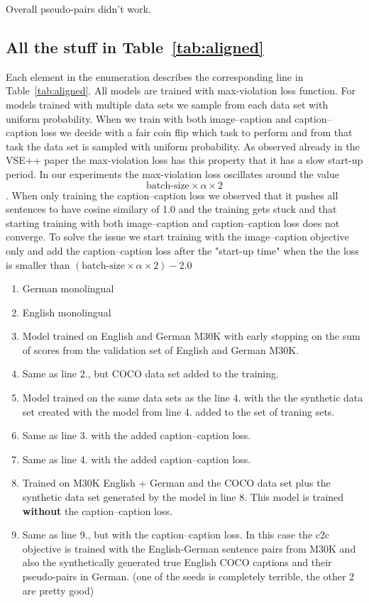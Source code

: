 Overall pseudo-pairs didn't work.

\subsection{All the stuff in Table~\ref{tab:aligned}}

Each element in the enumeration describes the corresponding line in Table~\ref{tab:aligned}. All models are trained with max-violation loss
function. For models trained with multiple data sets we sample from each
data set with uniform probability. When we train with both image--caption
and caption--caption loss we decide with a fair coin flip which task to
perform and from that task the data set is sampled with uniform
probability. As observed already in the VSE++ paper the max-violation 
loss has this property that it has a slow start-up period. In our
experiments the max-violation loss oscillates around the value
$$\textrm{batch-size} \times \alpha \times 2$$. When only training the
caption--caption loss we observed that it pushes all sentences to have
cosine similary of 1.0 and the training gets stuck and that starting 
training with both image--caption and caption--caption loss does not 
converge. To solve the issue we start training with the image--caption 
objective only and add the caption--caption loss after the 
"start-up time" when the the loss is  smaller than $(\textrm{batch-size} \times \alpha \times 2)-2.0$


\begin{enumerate}
    \item German monolingual 
    \item English monolingual
    \item Model trained on English and German M30K with early stopping on
    the sum of scores from the validation set of  English and German
    M30K.
    \item Same as line 2., but COCO data set added to the 
    training.
    \item Model trained on the same data sets as the line 4. with the
    the synthetic data set created with the model from line 4. added
    to the set of traning sets.
    \item Same as line 3. with the added caption--caption loss.
    \item Same as line 4. with the added caption--caption loss.
    \item Trained on M30K English + German and the COCO data set plus
    the synthetic data set generated by the model in line 8. This model
    is trained \textbf{without} the caption--caption loss.
    \item Same as line 9., but with the caption--caption loss. In this
    case the c2c objective is trained with the English-German sentence 
    pairs from M30K and also the synthetically generated true English
    COCO captions and their pseudo-pairs in German. (one of the seeds is
    completely terrible, the other 2 are pretty good)
\end{enumerate}

